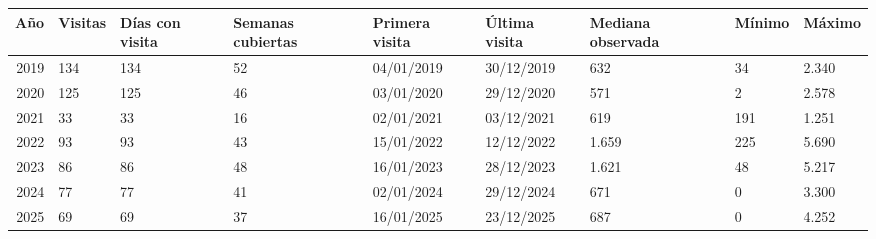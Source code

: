 \begin{tabular}{rllllllll}
\toprule
Año & Visitas & Días con visita & Semanas cubiertas & Primera visita & Última visita & Mediana observada & Mínimo & Máximo \\
\midrule
2019 & 134 & 134 & 52 & 04/01/2019 & 30/12/2019 & 632 & 34 & 2.340 \\
2020 & 125 & 125 & 46 & 03/01/2020 & 29/12/2020 & 571 & 2 & 2.578 \\
2021 & 33 & 33 & 16 & 02/01/2021 & 03/12/2021 & 619 & 191 & 1.251 \\
2022 & 93 & 93 & 43 & 15/01/2022 & 12/12/2022 & 1.659 & 225 & 5.690 \\
2023 & 86 & 86 & 48 & 16/01/2023 & 28/12/2023 & 1.621 & 48 & 5.217 \\
2024 & 77 & 77 & 41 & 02/01/2024 & 29/12/2024 & 671 & 0 & 3.300 \\
2025 & 69 & 69 & 37 & 16/01/2025 & 23/12/2025 & 687 & 0 & 4.252 \\
\bottomrule
\end{tabular}
